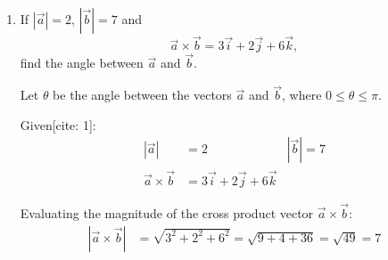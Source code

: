\begin{enumerate}[label=\thesubsection.\arabic*, ref=\thesubsection.\theenumi]
The operation $*$ is associative on $\mathbb{R}$ if for all $a, b, c \in \mathbb{R}$:
\begin{align*}
	(a * b) * c = a * (b * c)
\end{align*}

Evaluating the Left-Hand Side (LHS):
\begin{align*}
	(a * b) * c &= (a^2 + b^2) * c = (a^2 + b^2)^2 + c^2 = a^4 + 2a^2b^2 + b^4 + c^2
\end{align*}

Evaluating the Right-Hand Side (RHS):
\begin{align*}
	a * (b * c) &= a * (b^2 + c^2) = a^2 + (b^2 + c^2)^2 = a^2 + b^4 + 2b^2c^2 + c^4
\end{align*}

In general:
\begin{align*}
	(a^2 + b^2)^2 + c^2 \neq a^2 + (b^2 + c^2)^2
\end{align*}

Choose $a = 1$, $b = 2$, and $c = 3 \in \mathbb{R}$:
\begin{align*}
	(1 * 2) * 3 &= (1^2 + 2^2) * 3 = (1 + 4) * 3 = 5 * 3 = 5^2 + 3^2 = 25 + 9 = 34
\end{align*}
\begin{align*}
	1 * (2 * 3) &= 1 * (2^2 + 3^2) = 1 * (4 + 9) = 1 * 13 = 1^2 + 13^2 = 1 + 169 = 170
\end{align*}
Since $(1 * 2) * 3 \neq 1 * (2 * 3)$ ($34 \neq 170$), the operation $*$ is not associative.

Conclusion:
The operation $*$ is a binary operation, but it is not associative.


\item If $|\vec a|=2$, $|\vec b|=7$ and
\[
\vec a\times\vec b=3\vec i+2\vec j+6\vec k,
\]
find the angle between $\vec a$ and $\vec b$.

\solution
Let $\theta$ be the angle between the vectors $\vec{a}$ and $\vec{b}$, where $0 \le \theta \le \pi$.

Given[cite: 1]:
\begin{align*}
	|\vec{a}| &= 2 & |\vec{b}| = 7 \\
	\vec{a} \times \vec{b} &= 3\vec{i} + 2\vec{j} + 6\vec{k}
\end{align*}

Evaluating the magnitude of the cross product vector $\vec{a} \times \vec{b}$:
\begin{align*}
	|\vec{a} \times \vec{b}| &= \sqrt{3^2 + 2^2 + 6^2} = \sqrt{9 + 4 + 36} = \sqrt{49} = 7
\end{align*}


\end{enumerate}
